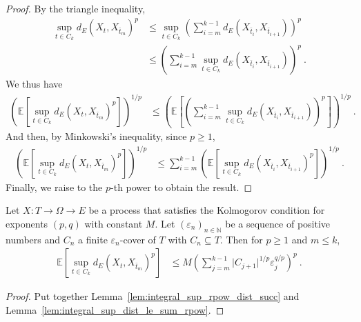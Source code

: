 \begin{proof}\leanok
By the triangle inequality,
\begin{align*}
  \sup_{t \in C_k} d_E(X_t, X_{\bar{t}_m})^p
  &\le \sup_{t \in C_k} \left( \sum_{i=m}^{k-1} d_E(X_{\bar{t}_i}, X_{\bar{t}_{i+1}}) \right)^p
  \\
  &\le \left( \sum_{i=m}^{k-1} \sup_{t \in C_k} d_E(X_{\bar{t}_i}, X_{\bar{t}_{i+1}}) \right)^p
  \: .
\end{align*}
We thus have
\begin{align*}
  \left(\mathbb{E} \left[\sup_{t \in C_k} d_E(X_t, X_{\bar{t}_m})^p \right]\right)^{1/p}
  &\le \left(\mathbb{E} \left[\left( \sum_{i=m}^{k-1} \sup_{t \in C_k} d_E(X_{\bar{t}_i}, X_{\bar{t}_{i+1}}) \right)^p\right]\right)^{1/p}
  \: .
\end{align*}
And then, by Minkowski's inequality, since $p \ge 1$,
\begin{align*}
  \left(\mathbb{E} \left[\sup_{t \in C_k} d_E(X_t, X_{\bar{t}_m})^p \right]\right)^{1/p}
  &\le \sum_{i=m}^{k-1} \left( \mathbb{E}\left[\sup_{t \in C_k} d_E(X_{\bar{t}_i}, X_{\bar{t}_{i+1}})^p \right] \right)^{1/p}
  \: .
\end{align*}
Finally, we raise to the $p$-th power to obtain the result.
\end{proof}


\begin{lemma}\label{lem:integral_sup_rpow_dist_le_sum}
  \leanok
Let $X : T \to \Omega \to E$ be a process that satisfies the Kolmogorov condition for exponents $(p,q)$ with constant $M$.
Let $(\varepsilon_n)_{n \in \mathbb{N}}$ be a sequence of positive numbers and $C_n$ a finite $\varepsilon_n$-cover of $T$ with $C_n \subseteq T$.
Then for $p \ge 1$ and $m \le k$,
\begin{align*}
  \mathbb{E} \left[\sup_{t \in C_k} d_E(X_t, X_{\bar{t}_m})^p \right]
  &\le M \left( \sum_{j=m}^{k-1} \vert C_{j+1} \vert^{1/p} \varepsilon_j^{q/p} \right)^p
  \: .
\end{align*}
\end{lemma}

\begin{proof}\leanok
Put together Lemma~\ref{lem:integral_sup_rpow_dist_succ} and Lemma~\ref{lem:integral_sup_dist_le_sum_rpow}.
\end{proof}


